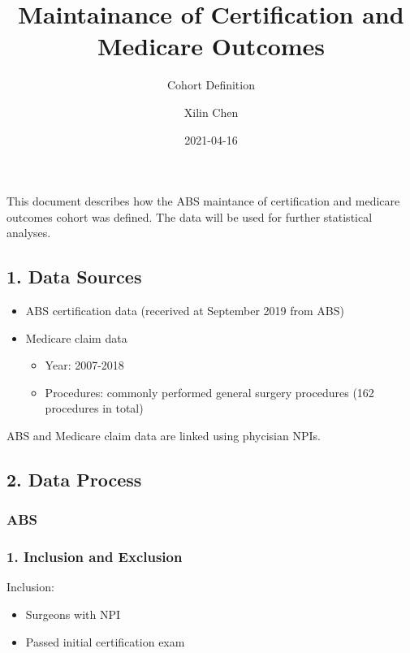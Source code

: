 \documentclass[
]{article}
\title{Maintainance of Certification and Medicare Outcomes}
\subtitle{Cohort Definition}
\author{Xilin Chen}
\date{2021-04-16}
\providecommand{\tightlist}{%
  \setlength{\itemsep}{0pt}\setlength{\parskip}{0pt}}
\begin{document}
\maketitle

{
\setcounter{tocdepth}{3}
\tableofcontents
}
This document describes how the ABS maintance of certification and
medicare outcomes cohort was defined. The data will be used for further
statistical analyses.

\hypertarget{data-sources}{%
\subsection{1. Data Sources}\label{data-sources}}

\begin{itemize}
\tightlist
\item
  ABS certification data (recerived at September 2019 from ABS)
\item
  Medicare claim data

  \begin{itemize}
  \tightlist
  \item
    Year: 2007-2018
  \item
    Procedures: commonly performed general surgery procedures (162
    procedures in total)
  \end{itemize}
\end{itemize}

ABS and Medicare claim data are linked using phycisian NPIs.

\hypertarget{data-process}{%
\subsection{2. Data Process}\label{data-process}}

\hypertarget{abs}{%
\subsubsection{ABS}\label{abs}}

\hypertarget{inclusion-and-exclusion}{%
\subsubsection{1. Inclusion and
Exclusion}\label{inclusion-and-exclusion}}

Inclusion:

\begin{itemize}
\tightlist
\item
  Surgeons with NPI
\item
  Passed initial certification exam
\end{itemize}
\end{document}
